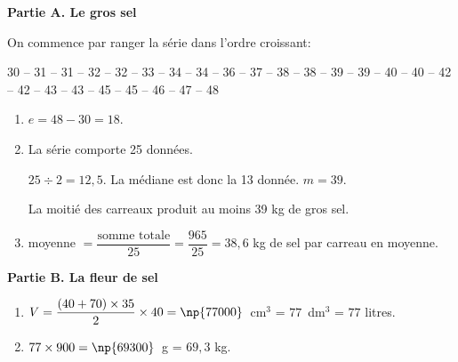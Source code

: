 \documentclass[10pt]{article}
\begin{document}
\setlength\parindent{0mm}
\pagestyle{fancy}
\thispagestyle{empty}
    
    
    




\medskip

\textbf{Partie A. Le gros sel}

\medskip

On commence par ranger la série dans l'ordre croissant:

30 -- 31 -- 31 -- 32 -- 32 -- 33 -- 34 -- 34 -- 36 -- 37 -- 38 -- 38 -- 39 -- 39 -- 40 -- 40 -- 42 -- 42 -- 43 -- 43 -- 45 -- 45 -- 46 -- 47 -- 48

\medskip

\begin{enumerate}
\item $e = 48 - 30 = 18$.
\item La série comporte 25 données.

$25 \div 2 = 12,5$. La médiane est donc la 13 donnée. $m = 39$.

La moitié des carreaux produit au moins 39 kg de gros sel.
\item  moyenne $= \dfrac{\text{somme totale}}{25} = \dfrac{965}{25} = 38,6$ kg de sel par carreau en moyenne.
\end{enumerate}

\bigskip

\textbf{Partie B. La fleur de sel}

\medskip

\begin{enumerate}
\item $V = \dfrac{(40 + 70) \times 35}{2} \times  40 = \np{77000}$~cm$^3$ = $77$~dm$^3$ = $77$ litres.
\item $77 \times  900 = \np{69300}$~g = $69,3$ kg.
\end{enumerate}

\vspace{0,5cm}
\end{document}
